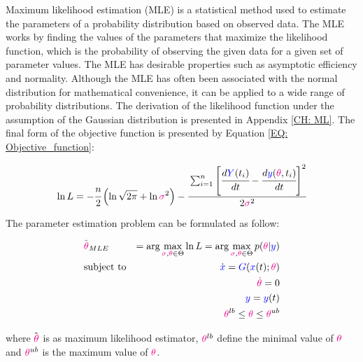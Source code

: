 \documentclass[../Article_Model_Parameters.tex]{subfiles}
\begin{document}
	Maximum likelihood estimation (MLE) is a statistical method used to estimate the parameters of a probability distribution based on observed data. The MLE works by finding the values of the parameters that maximize the likelihood function, which is the probability of observing the given data for a given set of parameter values. The MLE has desirable properties such as asymptotic efficiency and normality. Although the MLE has often been associated with the normal distribution for mathematical convenience, it can be applied to a wide range of probability distributions. The derivation of the likelihood function under the assumption of the Gaussian distribution is presented in Appendix \ref{CH: ML}. The final form of the objective function is presented by Equation \ref{EQ: Objective_function}:
	
	{\footnotesize
		\begin{equation} \label{EQ: Objective_function}
			\ln L = -\cfrac{n}{2} \left( \ln \sqrt{2 \pi} + \ln {\color{magenta} \sigma}^2 \right)
			- \cfrac{ \sum_{i=1}^{n} \left[  \cfrac{d {\color{blue}Y}(t_i)}{dt} - \cfrac{d{\color{blue}y}({\color{magenta} \theta}, t_i)}{dt} \right]^2 }{2 {\color{magenta} \sigma}^2}
		\end{equation}
	}
	
	The parameter estimation problem can be formulated as follow:
	
	{\footnotesize
		\begin{equation}
			\begin{aligned} \label{EQ: Optimization_formulation_MLE}
				&\hat{{\color{magenta} \theta}}_{MLE} &= \arg \max_{{\color{magenta} \sigma}, {\color{magenta} \theta} \in \Theta} \ln L = \arg \max_{{\color{magenta} \sigma},{\color{magenta} \theta} \in \Theta} p({\color{magenta} \theta}|{\color{blue}y}) \\
				&\text{subject to}
				& \dot{ {\color{blue}x} } = {\color{blue}G}({\color{blue} x}(t);{\color{magenta} \theta}) \\
				&& {\color{magenta} \dot{\theta}} = 0 \\
				&& {\color{blue}y} = {\color{blue}y}(t) \\
				&& {\color{magenta} \theta}^{lb} \leq {\color{magenta} \theta} \leq {\color{magenta} \theta}^{ub}
			\end{aligned}
	\end{equation} } 
	
	where $\hat{{\color{magenta} \theta}}$ is as maximum likelihood estimator, ${\color{magenta} \theta}^{lb}$ define the minimal value of ${\color{magenta} \theta}$ and ${\color{magenta} \theta}^{ub}$ is the maximum value of ${\color{magenta} \theta}$.
	
\end{document}
